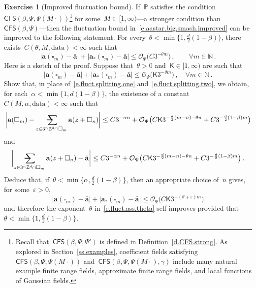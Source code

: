 \documentclass[11pt,twoside]{article} %
\makeatletter
\let\oldsquare\square %
\renewcommand{\square}{\oldsquare}
\numberwithin{equation}{section}
\theoremstyle{definition}
\newtheorem{exercise}[theorem]{Exercise}
\newcommand*{\N}{\ensuremath{\mathbb{N}}}
\newcommand*{\Zd}{\ensuremath{\mathbb{Z}^d}}
\newcommand{\eps}{\varepsilon}
\newcommand{\ep}{\eps}
\renewcommand{\a}{\mathbf{a}}
\newcommand{\ahom}{\bar{\a}}
\newcommand{\cu}{\square}
\renewcommand{\P}{\mathbb{P}}
\renewcommand{\O}{\mathcal{O}}
\newcommand{\data}{\mathrm{data}}
\newcommand{\avsum}{\mathop{\mathpalette\avsuminner\relax}\displaylimits}
\newcommand\avsuminner[2]{%
  {\sbox0{$\m@th#1\sum$}%
   \vphantom{\usebox0}%
   \ooalign{%
     \hidewidth
     \smash{\,\rule[.23em]{8.8pt}{1.1pt} \relax}%
     \hidewidth\cr
   ~$\m@th#1\sum$\cr
   }%
  }%
}
\newcommand{\CFS}{\mathsf{CFS}}
\makeatother
\begin{document}
\begin{exercise}[Improved fluctuation bound]
\label{exercise.improved.fluct}
If~$\P$ satisfies the condition~$\CFS(\beta,\Psi,\Psi(M\cdot))$\footnote{Recall that~$\CFS(\beta,\Psi,\Psi')$ is defined in Definition~\ref{d.CFS.strong}. As explored in Section~\ref{ss.examples}, coefficient fields satisfying~$\CFS(\beta,\Psi,\Psi(M\cdot))$ and~$\CFS(\beta,\Psi,\Psi(M\cdot),\gamma)$ include many natural example finite range fields, approximate finite range fields, and local functions of Gaussian fields.} for some~$M\in[1,\infty)$---a stronger condition than~$\CFS(\beta,\Psi)$---then the fluctuation bound in~\eqref{e.aastar.big.smash.improved} can be improved to the following statement. For every~$\theta < \min\{ 1,\frac d2(1-\beta) \}$, there exists~$C(\theta,M,\data)<\infty$ such that
\begin{equation}
\label{e.fluctuations.up.to.one}
| \a(\cu_m) - \ahom |
+
|\a_*(\cu_m) - \ahom |
\leq 
\O_\Psi \bigl( C3^{-\theta m} \bigr)
\,, \qquad 
\forall m\in\N
\,.
\end{equation}
Here is a sketch of the proof. Suppose that~$\theta>0$ and~$\mathsf{K} \in[1,\infty)$ are such that 
\begin{equation}
\label{e.fluct.ass.theta}
| \a(\cu_m) - \ahom |
+
|\a_*(\cu_m) - \ahom |
\leq 
\O_\Psi \bigl( \mathsf{K} 3^{-\theta m} \bigr) 
\,, \quad \forall m\in\N\,.
\end{equation}
Show that, in place of~\eqref{e.fluct.splitting.one} and~\eqref{e.fluct.splitting.two}, we obtain, for each~$\alpha < \min\{ 1, d(1-\beta) \}$, the existence of a constant~$C(M,\alpha,\data)<\infty$ such that
\begin{equation}
\label{e.fluct.splitting.one.CFS.Psi.Psi}
\biggl| \a(\cu_m) -  \avsum_{z\in 3^n\Zd\cap\cu_m}
\a(z+\cu_n) \biggr|
\leq
C 3^{-\alpha n} +\O_\Psi\bigl( C \mathsf{K} 3^{- \frac d2(m-n) - \theta n} + C3^{-\frac d2(1-\beta)m} \bigr)
\end{equation}
and
\begin{equation}
\label{e.fluct.splitting.two.CFS.Psi.Psi}
\biggl|\avsum_{z\in 3^n\Zd\cap\cu_m}
\a(z+\cu_n) - \ahom \biggr|
\leq
C 3^{-\alpha n} +\O_\Psi\bigl( C\mathsf{K} 3^{- \frac d2(m-n)-\theta n} + C3^{-\frac d2(1-\beta)m} \bigr)
\,.
\end{equation}
Deduce that, if~$\theta< \min\{ \alpha, \frac d2(1-\beta) \}$, then an appropriate choice of~$n$ gives, for some~$\ep>0$, 
\begin{equation*}
| \a(\cu_m) - \ahom |
+
|\a_*(\cu_m) - \ahom |
\leq 
\O_\Psi \bigl( C\mathsf{K} 3^{-(\theta+\ep) m} \bigr) 
\end{equation*}
and therefore the exponent~$\theta$ in~\eqref{e.fluct.ass.theta} self-improves provided that~$\theta< \min\{ 1, \frac d2(1-\beta) \}$.
\end{exercise}
\end{document}
